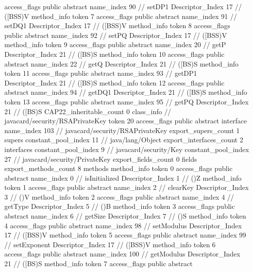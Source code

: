 {{{{{					access_flags	public abstract
					name_index	90		// setDP1
					Descriptor_Index	17		// ([BSS)V
				}
				method_info {
					token	7
					access_flags	public abstract
					name_index	91		// setDQ1
					Descriptor_Index	17		// ([BSS)V
				}
				method_info {
					token	8
					access_flags	public abstract
					name_index	92		// setPQ
					Descriptor_Index	17		// ([BSS)V
				}
				method_info {
					token	9
					access_flags	public abstract
					name_index	20		// getP
					Descriptor_Index	21		// ([BS)S
				}
				method_info {
					token	10
					access_flags	public abstract
					name_index	22		// getQ
					Descriptor_Index	21		// ([BS)S
				}
				method_info {
					token	11
					access_flags	public abstract
					name_index	93		// getDP1
					Descriptor_Index	21		// ([BS)S
				}
				method_info {
					token	12
					access_flags	public abstract
					name_index	94		// getDQ1
					Descriptor_Index	21		// ([BS)S
				}
				method_info {
					token	13
					access_flags	public abstract
					name_index	95		// getPQ
					Descriptor_Index	21		// ([BS)S
				}
			}
			CAP22_inheritable_count	0
		}
		class_info {		// javacard/security/RSAPrivateKey
			token	20
			access_flags	public abstract interface
			name_index	103		// javacard/security/RSAPrivateKey
			export_supers_count	1
			supers {
				constant_pool_index	11		// java/lang/Object
			}
			export_interfaces_count	2
			interfaces {
				constant_pool_index	9		// javacard/security/Key
				constant_pool_index	27		// javacard/security/PrivateKey
			}
			export_fields_count	0
			fields {
			}
			export_methods_count	8
			methods {
				method_info {
					token	0
					access_flags	public abstract
					name_index	0		// isInitialized
					Descriptor_Index	1		// ()Z
				}
				method_info {
					token	1
					access_flags	public abstract
					name_index	2		// clearKey
					Descriptor_Index	3		// ()V
				}
				method_info {
					token	2
					access_flags	public abstract
					name_index	4		// getType
					Descriptor_Index	5		// ()B
				}
				method_info {
					token	3
					access_flags	public abstract
					name_index	6		// getSize
					Descriptor_Index	7		// ()S
				}
				method_info {
					token	4
					access_flags	public abstract
					name_index	98		// setModulus
					Descriptor_Index	17		// ([BSS)V
				}
				method_info {
					token	5
					access_flags	public abstract
					name_index	99		// setExponent
					Descriptor_Index	17		// ([BSS)V
				}
				method_info {
					token	6
					access_flags	public abstract
					name_index	100		// getModulus
					Descriptor_Index	21		// ([BS)S
				}
				method_info {
					token	7
					access_flags	public abstract
}}}}}
